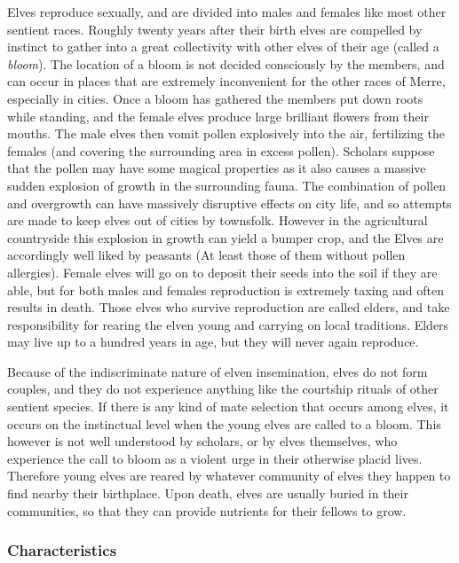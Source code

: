 \documentclass[paper=a4, fontsize=11pt]{scrartcl} %
\begin{document}
\begin{multicols}{2}
Elves reproduce sexually, and are divided into males and females like most other sentient races. Roughly twenty years after their birth elves are compelled by instinct to gather into a great collectivity with other elves of their age (called a \textit{bloom}). The location of a bloom is not decided consciously by the members, and can occur in places that are extremely inconvenient for the other races of Merre, especially in cities. Once a bloom has gathered the members put down roots while standing, and the female elves produce large brilliant flowers from their mouths. The male elves then vomit pollen explosively into the air, fertilizing the females (and covering the surrounding area in excess pollen). Scholars suppose that the pollen may have some magical properties as it also causes a massive sudden explosion of growth in the surrounding fauna. The combination of pollen and overgrowth can have massively disruptive effects on city life, and so attempts are made to keep elves out of cities by townsfolk. However in the agricultural countryside this explosion in growth can yield a bumper crop, and the Elves are accordingly well liked by peasants (At least those of them without pollen allergies). Female elves will go on to deposit their seeds into the soil if they are able, but for both males and females reproduction is extremely taxing and often results in death. Those elves who survive reproduction are called elders, and take responsibility for rearing the elven young and carrying on local traditions. Elders may live up to a hundred years in age, but they will never again reproduce.

Because of the indiscriminate nature of elven insemination, elves do not form couples, and they do not experience anything like the courtship rituals of other sentient species. If there is any kind of mate selection that occurs among elves, it occurs on the instinctual level when the young elves are called to a bloom. This however is not well understood by scholars, or by elves themselves, who experience the call to bloom as a violent urge in their otherwise placid lives. Therefore young elves are reared by whatever community of elves they happen to find nearby their birthplace. Upon death, elves are usually buried in their communities, so that they can provide nutrients for their fellows to grow.

\subsubsection{Characteristics}


\end{multicols}
\end{document}
